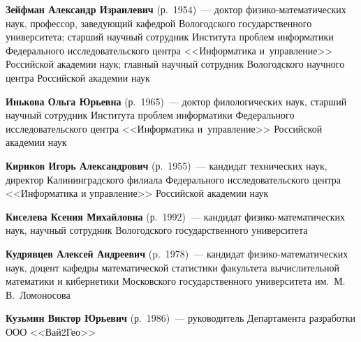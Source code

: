 \begin{multicols}{2}
\noindent
\textbf{Зейфман Александр Израилевич} (р.\ 1954)~--- 
доктор фи\-зи\-ко-ма\-те\-ма\-ти\-че\-ских наук, профессор, 
за\-ве\-ду\-ющий кафедрой Вологодского государственного университета; 
старший научный сотрудник Института проб\-лем информатики Федерального 
исследовательского центра <<Информатика и~управ\-ле\-ние>> 
Российской академии наук; главный научный сотрудник Вологодского 
научного центра Российской академии наук

\vspace*{3pt}

\noindent
\textbf{Инькова Ольга Юрьевна} (р.\ 1965)~--- доктор филологических наук, 
старший научный сотрудник Института проб\-лем информатики Федерального 
исследовательского центра <<Информатика и~управ\-ле\-ние>> Российской академии наук

\vspace*{3pt}



\noindent
\textbf{Кириков Игорь Александрович} (р.\ 1955)~---
 кандидат технических наук, директор Калининградского филиала Федерального 
 исследовательского центра <<Информатика и управление>> Российской академии наук

\vspace*{3pt}

\noindent
\textbf{Киселева Ксения Михайловна} (р.\ 1992)~--- 
кандидат фи\-зи\-ко-ма\-те\-ма\-ти\-че\-ских наук, 
научный сотрудник Вологодского государственного университета

\vspace*{3pt}

\noindent
\textbf{Кудрявцев Алексей Андреевич} (p.\ 1978)~--- 
кандидат фи\-зи\-ко-ма\-те\-ма\-ти\-че\-ских наук, доцент кафедры математической 
статистики факультета вычислительной математики и кибернетики Московского 
государственного университета им.\ М.\,В.~Ломоносова

\vspace*{3pt}

\noindent
\textbf{Кузьмин Виктор Юрьевич} (р.\ 1986)~--- 
руководитель Департамента разработки ООО <<Вай2Гео>>


\vspace*{3pt}


\end{multicols}
